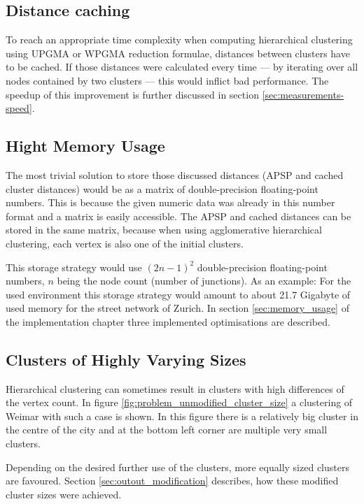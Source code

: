 \subsection{Distance caching} \label{sec:concept_distance_caching}
To reach an appropriate time complexity when computing hierarchical clustering using \acrshort{UPGMA} or \acrshort{WPGMA} reduction formulae, distances between clusters have to be cached. If those distances were calculated every time --- by iterating over all nodes contained by two clusters --- this would inflict bad performance. The speedup of this improvement is further discussed in section \ref{sec:measurements-speed}.

\subsection{Hight Memory Usage} \label{sec:concept_memory_usage}
The most trivial solution to store those discussed distances (\acrshort{APSP} and cached cluster distances) would be as a matrix of double-precision floating-point numbers. This is because the given numeric data was already in this number format and a matrix is easily accessible. The \acrshort{APSP} and cached distances can be stored in the same matrix, because when using agglomerative hierarchical clustering, each vertex is also one of the initial clusters.

This storage strategy would use $(2n-1)^2$ double-precision floating-point numbers, $n$ being the node count (number of junctions). As an example: For the used environment this storage strategy would amount to about 21.7 Gigabyte of used memory for the street network of Zurich. In section \ref{sec:memory_usage} of the implementation chapter three implemented optimisations are described.

\subsection{Clusters of Highly Varying Sizes} \label{sec:concept_cluster_sizes}
Hierarchical clustering can sometimes result in clusters with high differences of the vertex count. In figure \ref{fig:problem_unmodified_cluster_size} a clustering of Weimar with such a case is shown. In this figure there is a relatively big cluster in the centre of the city and at the bottom left corner are multiple very small clusters.

Depending on the desired further use of the clusters, more equally sized clusters are favoured. Section \ref{sec:outout_modification} describes, how these modified cluster sizes were achieved.

